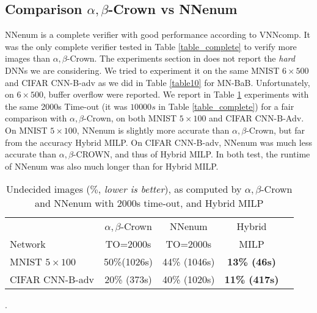 \newpage

	\subsection*{Comparison $\alpha,\beta$-Crown vs NNenum}

NNenum \cite{nnenum} is a complete verifier with good performance according to VNNcomp.
It was the only complete verifier tested in Table \ref{table_complete} to verify more images than $\alpha,\beta$-Crown. The experiments section in \cite{nnenum} does not report
the {\em hard} DNNs we are considering. We tried to experiment it on the same MNIST 
$6 \times 500$ and CIFAR CNN-B-adv as we did in Table \ref{table10} for MN-BaB. Unfortunately, on $6 \times 500$, buffer overflow were reported.
We report in Table \ref{table11} experiments with the same 2000s Time-out (it was $10 000s$ in Table \ref{table_complete})  for a fair comparison with $\alpha,\beta$-Crown, on both 
MNIST $5 \times 100$ and CIFAR CNN-B-Adv. 
On MNIST $5 \times 100$, NNenum is slightly more accurate than $\alpha,\beta$-Crown, but far from the accuracy Hybrid MILP.
On CIFAR CNN-B-adv, NNenum was much less accurate than $\alpha,\beta$-CROWN, and thus of Hybrid MILP. In both test, the runtime of NNenum was also much longer than for Hybrid MILP.


\begin{table}[h!]
	\centering
	\begin{tabular}{||l||c||c|c||c||}
		\hline \hline
		 & $\alpha,\beta$-Crown & NNenum & Hybrid\\ 
		 Network & TO=2000s &  TO=2000s & MILP\\ 
		\hline
		MNIST $5 \times 100$ & 50\%(1026s) & 44\% (1046s) & \bf 13\% (46s)\\ \hline
		CIFAR CNN-B-adv & 20\% (373s) & 40\% (1020s) & \bf 11\% (417s)\\ \hline 
	\end{tabular}
	\caption{Undecided images ($\%$, {\em lower is better}), as computed by $\alpha,\beta$-Crown and NNenum with 2000s time-out, and Hybrid MILP}.
	\label{table11}
\end{table}


